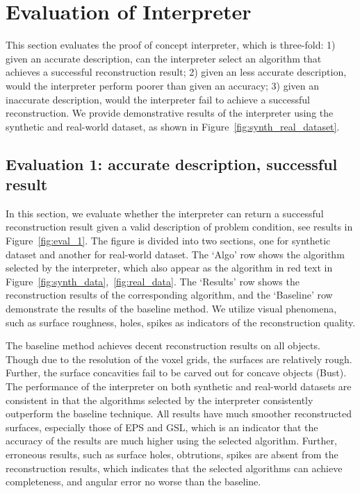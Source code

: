 \section{Evaluation of Interpreter}
\label{sec:eval_interp}
This section evaluates the proof of concept interpreter, which is three-fold: 1) given an accurate description, can the interpreter select an algorithm that achieves a successful reconstruction result; 2) given an less accurate description, would the interpreter perform poorer than given an accuracy; 3) given an inaccurate description, would the interpreter fail to achieve a successful reconstruction. We provide demonstrative results of the interpreter using the synthetic and real-world dataset, as shown in Figure~\ref{fig:synth_real_dataset}.

\subsection{Evaluation 1: accurate description, successful result}
In this section, we evaluate whether the interpreter can return a successful reconstruction result given a valid description of problem condition, see results in Figure~\ref{fig:eval_1}. The figure is divided into two sections, one for synthetic dataset and another for real-world dataset. The `Algo' row shows the algorithm selected by the interpreter, which also appear as the algorithm in red text in Figure~\ref{fig:synth_data},~\ref{fig:real_data}. The `Results' row shows the reconstruction results of the corresponding algorithm, and the `Baseline' row demonstrate the results of the baseline method. We utilize visual phenomena, such as surface roughness, holes, spikes as indicators of the reconstruction quality.

The baseline method achieves decent reconstruction results on all objects. Though due to the resolution of the voxel grids, the surfaces are relatively rough. Further, the surface concavities fail to be carved out for concave objects (Bust). The performance of the interpreter on both synthetic and real-world datasets are consistent in that the algorithms selected by the interpreter consistently outperform the baseline technique. All results have much smoother reconstructed surfaces, especially those of EPS and GSL, which is an indicator that the accuracy of the results are much higher using the selected algorithm. Further, erroneous results, such as surface holes, obtrutions, spikes are absent from the reconstruction results, which indicates that the selected algorithms can achieve completeness, and angular error no worse than the baseline.

